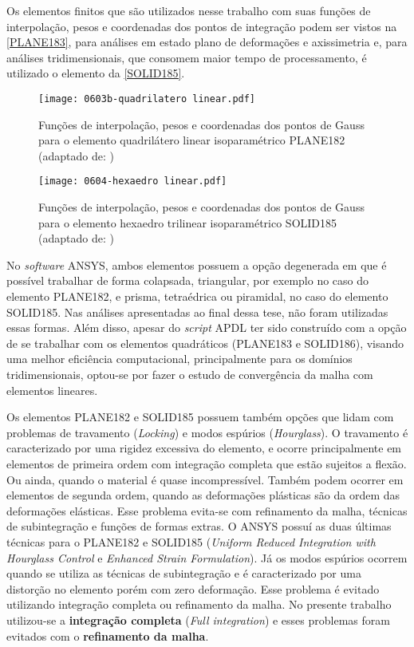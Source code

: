 Os elementos finitos que são utilizados nesse trabalho com suas funções de interpolação, pesos e coordenadas dos pontos de integração podem ser vistos na \autoref{PLANE183}, para análises em estado plano de deformações e axissimetria e, para análises tridimensionais, que consomem maior tempo de processamento, é utilizado o elemento da \autoref{SOLID185}.
\begin{figure}[H]
	\begin{center}
		\texttt{[image: 0603b-quadrilatero linear.pdf]}
	\end{center}
	\caption{\label{PLANE183}Funções de interpolação, pesos e coordenadas dos pontos de Gauss para o elemento quadrilátero linear isoparamétrico PLANE182 (adaptado de: )}
\end{figure}
\begin{figure}[H]
	\begin{center}
		\texttt{[image: 0604-hexaedro linear.pdf]}
	\end{center}
	\caption{\label{SOLID185}Funções de interpolação, pesos e coordenadas dos pontos de Gauss para o elemento hexaedro trilinear isoparamétrico SOLID185 (adaptado de: )}
\end{figure}

No \textit{software} ANSYS, ambos elementos possuem a opção degenerada em que é possível trabalhar de forma colapsada, triangular, por exemplo no caso do elemento PLANE182, e prisma, tetraédrica ou piramidal, no caso do elemento SOLID185. Nas análises apresentadas ao final dessa tese, não foram utilizadas essas formas. Além disso, apesar do \textit{script} APDL ter sido construído com a opção de se trabalhar com os elementos quadráticos (PLANE183 e SOLID186), visando uma melhor eficiência computacional, principalmente para os domínios tridimensionais, optou-se por fazer o estudo de convergência da malha com elementos lineares.

Os elementos PLANE182 e SOLID185 possuem também opções que lidam com problemas de travamento (\textit{Locking}) e modos espúrios (\textit{Hourglass}). O travamento é caracterizado por uma rigidez excessiva do elemento, e ocorre principalmente em elementos de primeira ordem com integração completa que estão sujeitos a flexão. Ou ainda, quando o material é quase incompressível. Também podem ocorrer em elementos de segunda ordem, quando as deformações plásticas são da ordem das deformações elásticas. Esse problema evita-se com refinamento da malha, técnicas de subintegração e funções de formas extras. O ANSYS possuí as duas últimas técnicas para o PLANE182 e SOLID185 (\textit{Uniform Reduced Integration with Hourglass Control} e \textit{Enhanced Strain Formulation}). Já os modos espúrios ocorrem quando se utiliza as técnicas de subintegração e é caracterizado por uma distorção no elemento porém com zero deformação. Esse problema é evitado utilizando integração completa ou refinamento da malha. No presente trabalho utilizou-se a \textbf{integração completa} (\textit{Full integration}) e esses problemas foram evitados com o \textbf{refinamento da malha}. 

